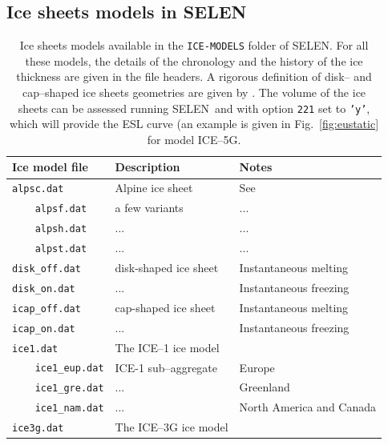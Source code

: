 \documentclass[11pt,fleqn,a4paper,titlepage]{article}
\newcommand\selen{\textsf{SELEN~}}
\newcommand\selens{\textsf{SELEN}}
\begin{document}
\subsection{Ice sheets models in \selen}
%
%
\begin{table}[!hbp] 
\begin{center}
\caption[{Ice sheets models}]{Ice sheets models available in the \texttt{ICE-MODELS} folder of \selens. 
For all these models, the details of the chronology and the history of the ice thickness 
are given in the file headers. A rigorous definition of disk-- and cap--shaped 
ice sheets geometries are given by \citet{Spada_etal_2011}. The volume of the ice sheets can be 
assessed running \selen and with option \texttt{221} set to \texttt{'y'}, which will provide the ESL curve 
(an example is given in Fig.~\ref{fig:eustatic} for model ICE--5G.}
\begin{tabular}{lll}
\\
\hline
Ice model file &  Description & Notes \\
\hline
\texttt{alpsc.dat}             &  Alpine ice sheet  & See \citet{Spada_etal_2009} \\
\texttt{~~~~alpsf.dat}         &  a few variants  & ... \\
\texttt{~~~~alpsh.dat}         &  ...  & ... \\
\texttt{~~~~alpst.dat}         &  ...  & ...  \\
\texttt{disk\_off.dat}         &  disk-shaped ice sheet & Instantaneous melting  \\
\texttt{disk\_on.dat}          &  ...                   & Instantaneous freezing \\
\texttt{icap\_off.dat}         &  cap-shaped ice sheet  & Instantaneous melting  \\
\texttt{icap\_on.dat}          &  ...                   & Instantaneous freezing  \\
\texttt{ice1.dat}              &  The ICE--1 ice model  & \citet{Peltier_and_Andrews_1976}\\
\texttt{~~~~ice1\_eup.dat}     &  ICE-1 sub--aggregate  & Europe \\
\texttt{~~~~ice1\_gre.dat}     &  ...                   & Greenland\\
\texttt{~~~~ice1\_nam.dat}     &  ...                   & North America and Canada\\
\texttt{ice3g.dat}             & The ICE--3G ice model  & \citet{Tushingham_and_Peltier_1991}\\

\end{tabular}
\end{center}
\end{table}
\end{document}
